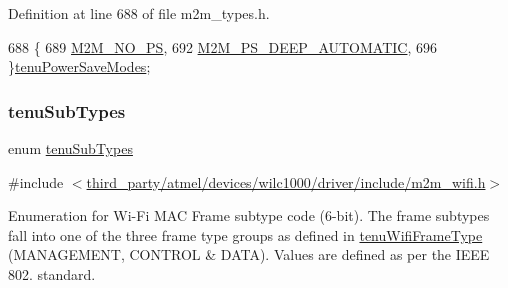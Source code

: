 Definition at line 688 of file m2m\+\_\+types.\+h.


\begin{DoxyCode}
688              \{
689     \hyperlink{group__WlanEnums_ggae6bd0ac78bfca4cda17d9dbedf79ad7ea3981eb69690432d09abdf1c5dd75d435}{M2M\_NO\_PS},
692     \hyperlink{group__WlanEnums_ggae6bd0ac78bfca4cda17d9dbedf79ad7ea6e07d1e218848620c1473a92f7a5ec10}{M2M\_PS\_DEEP\_AUTOMATIC},
696 \}\hyperlink{group__WlanEnums_gae6bd0ac78bfca4cda17d9dbedf79ad7e}{tenuPowerSaveModes};
\end{DoxyCode}
\mbox{\label{group__WlanEnums_gaef9606d02acd4b3ce5497f5eb4176f2a}} 
\subsubsection{\texorpdfstring{tenu\+Sub\+Types}{tenuSubTypes}}
{\footnotesize\ttfamily enum \hyperlink{group__WlanEnums_gaef9606d02acd4b3ce5497f5eb4176f2a}{tenu\+Sub\+Types}}



{\ttfamily \#include $<$\hyperlink{m2m__wifi_8h}{third\+\_\+party/atmel/devices/wilc1000/driver/include/m2m\+\_\+wifi.\+h}$>$}



Enumeration for Wi-\/\+Fi M\+AC Frame subtype code (6-\/bit). The frame subtypes fall into one of the three frame type groups as defined in \hyperlink{group__WlanEnums_ga593eb9b713b71fcc9cae6e81393b40d9}{tenu\+Wifi\+Frame\+Type} (M\+A\+N\+A\+G\+E\+M\+E\+NT, C\+O\+N\+T\+R\+OL \& D\+A\+TA). Values are defined as per the I\+E\+EE 802. standard. 

